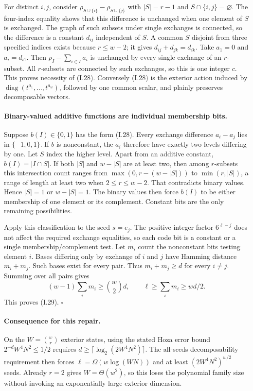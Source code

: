 For distinct $i,j$, consider
$\rho_{S\cup\{i\}}-\rho_{S\cup\{j\}}$ with
$|S|=r-1$ and $S\cap\{i,j\}=\varnothing$.
The four-index equality shows that this difference is unchanged
when one element of $S$ is exchanged.  The graph of such subsets
under single exchanges is connected, so the difference is a
constant $d_{ij}$ independent of $S$.  A common $S$ disjoint
from three specified indices exists because $r\le w-2$;
it gives $d_{ij}+d_{jk}=d_{ik}$.  Take $a_1=0$ and
$a_i=d_{i1}$.  Then
$\rho_I-\sum_{i\in I}a_i$ is unchanged by every single exchange
of an $r$-subset.  All $r$-subsets are connected by such
exchanges, so this is one integer $c$.  This proves necessity
of (I.28).  Conversely (I.28) is the exterior action induced by
$\operatorname{diag}(t^{a_1},\ldots,t^{a_w})$, followed by
one common scalar, and plainly preserves decomposable vectors.

\paragraph{Binary-valued additive functions are individual membership bits.}
Suppose $b(I)\in\{0,1\}$ has the form (I.28).
Every exchange difference $a_i-a_j$ lies in $\{-1,0,1\}$.
If $b$ is nonconstant, the $a_i$ therefore have exactly two
levels differing by one.  Let $S$ index the higher level.
Apart from an additive constant, $b(I)=|I\cap S|$.
If both $|S|$ and $w-|S|$ are at least two, then among
$r$-subsets this intersection count ranges from
$\max(0,r-(w-|S|))$ to $\min(r,|S|)$, a range of length
at least two when $2\le r\le w-2$.  That contradicts binary
values.  Hence $|S|=1$ or $w-|S|=1$.
The binary values then force $b(I)$ to be either membership
of one element or its complement.  Constant bits are the only
remaining possibilities.

Apply this classification to the seed $s=e_j$.  The positive
integer factor $6^{\ell-j}$ does not affect the required
exchange equalities, so each code bit is a constant or a single
membership/complement test.  Let $m_i$ count the nonconstant
bits testing element $i$.  Bases differing only by exchange of
$i$ and $j$ have Hamming distance $m_i+m_j$.  Such bases exist
for every pair.  Thus $m_i+m_j\ge d$ for every $i\ne j$.
Summing over all pairs gives
\[
 (w-1)\sum_i m_i\ge\binom w2d,
 \qquad \ell\ge\sum_i m_i\ge wd/2.
\]
This proves (I.29). \hfill$\square$

\paragraph{Consequence for this repair.}
On the $W=\binom wr$ exterior states, using the stated Hoza
error bound $2^{-d}W^4N^2\le1/2$ requires
$d\ge\lceil\log_2(2W^4N^2)\rceil$.
The all-seeds decomposability requirement then forces
$\ell=\Omega(w\log(WN))$ and at least
$(2W^4N^2)^{w/2}$ seeds.  Already $r=2$ gives
$W=\Theta(w^2)$, so this loses the polynomial family size
without invoking an exponentially large exterior dimension.

